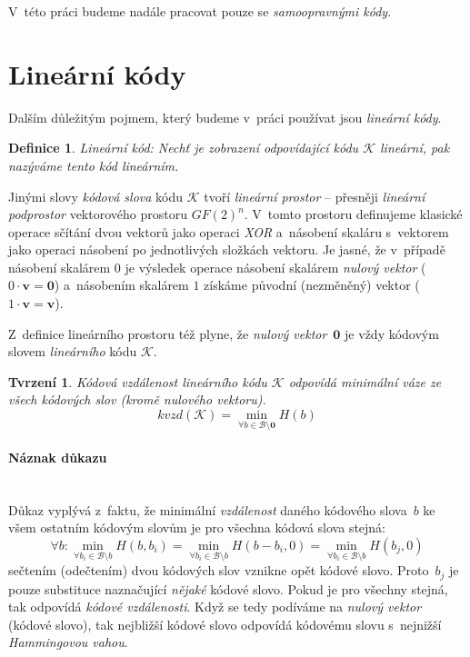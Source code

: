 \documentclass[thesis=M,czech,hidelinks]{FITthesis}[2012/06/26]
\newcommand{\0}{{\textcolor[gray]{0.75}{0}}}
\newtheorem{tvrzeni}{Tvrzení}
\newtheorem{definice}{Definice}
\begin{document}
V~této práci budeme nadále pracovat pouze se \emph{samoopravnými kódy}.



\section{Lineární kódy}\label{kap_linearni_kody}
Dalším důležitým pojmem, který budeme v~práci používat jsou \emph{lineární
kódy}.

\begin{definice}{Lineární kód:}
    Nechť je zobrazení odpovídající kódu $\mathcal{K}$ \emph{lineární},
    pak nazýváme tento kód \emph{lineárním}.
\end{definice}

Jinými slovy \emph{kódová slova} kódu $\mathcal{K}$ tvoří \emph{lineární
prostor} -- přesněji \emph{lineární podprostor} vektorového prostoru $GF(2)^n$.
V~tomto prostoru definujeme klasické operace sčítání dvou vektorů jako operaci
\emph{XOR} a~násobení skaláru s~vektorem jako operaci násobení po jednotlivých
složkách vektoru. Je jasné, že v~případě násobení skalárem $0$ je výsledek
operace násobení skalárem \emph{nulový vektor} ($0 \cdot \mathbf{v} = \mathbf{0}$)
a~násobením skalárem $1$ získáme původní (nezměněný) vektor
($1 \cdot \mathbf{v} = \mathbf{v}$).

Z~definice lineárního prostoru též plyne, že \emph{nulový vektor}~$\mathbf{0}$
je vždy kódovým slovem \emph{lineárního} kódu $\mathcal{K}$.

\begin{tvrzeni}
    Kódová vzdálenost lineárního kódu $\mathcal{K}$ odpovídá minimální váze ze
    všech kódových slov (kromě nulového vektoru).
    $$
        kvzd(\mathcal{K}) =
        \min_{\forall b \in \mathcal{B} \setminus \mathbf{0}} H(b)
    $$
\end{tvrzeni}
\paragraph{Náznak důkazu} \hfil \\
Důkaz vyplývá z~faktu, že minimální \emph{vzdálenost} daného kódového slova~$b$
ke všem ostatním kódovým slovům je pro všechna kódová slova stejná:
$$
    \forall b :
    \min_{\forall b_i \in \mathcal{B} \setminus b} H( b,     b_i ) =
    \min_{\forall b_i \in \mathcal{B} \setminus b} H( b-b_i, 0   ) =
    \min_{\forall b_i \in \mathcal{B} \setminus b} H( b_j,   0   )
$$
sečtením (odečtením) dvou kódových slov vznikne opět kódové slovo. Proto~$b_j$
je pouze substituce naznačující \emph{nějaké} kódové slovo. Pokud je pro všechny
stejná, tak odpovídá \emph{kódové vzdálenosti}. Když se tedy podíváme na
\emph{nulový vektor} (kódové slovo), tak nejbližší kódové slovo odpovídá
kódovému slovu s~nejnižší \emph{Hammingovou vahou}.
\end{document}

